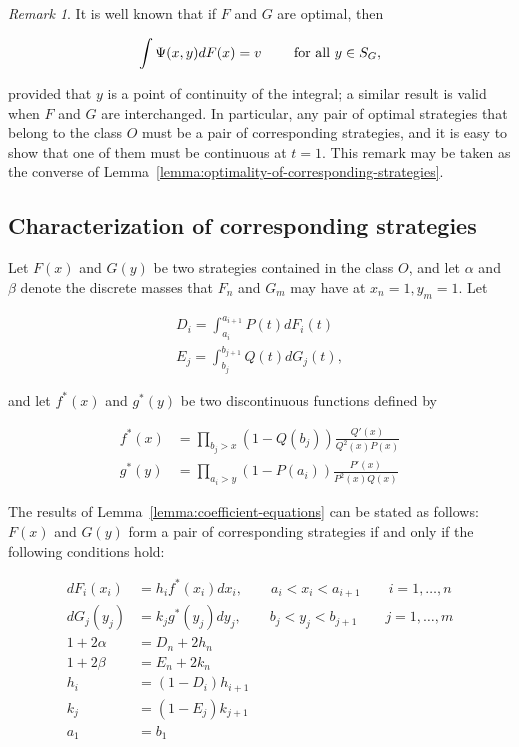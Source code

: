 \documentclass{article}
\theoremstyle{remark}
\newtheorem{remark}{Remark}
\begin{document}
\begin{remark}

It is well known that if $F$ and $G$ are optimal, then

\[
\int \Psi(x, y) dF(x) = v \qquad \textup{ for all } y \in S_G,
\]

provided that $y$ is a point of continuity of the integral; a similar result is
valid when $F$ and $G$ are interchanged. In particular, any pair of optimal
strategies that belong to the class $O$ must be a pair of corresponding
strategies, and it is easy to show that one of them must be continuous at
$t=1$. This remark may be taken as the converse of
Lemma~\ref{lemma:optimality-of-corresponding-strategies}.

\end{remark}

\subsection{Characterization of corresponding strategies}

Let $F(x)$ and $G(y)$ be two strategies contained in the class $O$, and let
$\alpha$ and $\beta$ denote the discrete masses that $F_n$ and $G_m$ may have
at $x_n = 1, y_m=1$. Let

\[
\begin{aligned}
D_i = \int_{a_i}^{a_{i+1}} P(t) dF_i(t) \\
E_j = \int_{b_j}^{b_{j+1}} Q(t) dG_j(t),
\end{aligned}
\]

and let $f^*(x)$ and $g^*(y)$ be two discontinuous functions defined by

\begin{align}
f^*(x) &= \prod_{b_j > x} (1-Q(b_j)) \frac{Q'(x)}{Q^2(x) P(x)}
\label{eqn:characterization-6} \\
g^*(y) &= \prod_{a_i > y} (1-P(a_i)) \frac{P'(x)}{P^2(x) Q(x)} \label{eqn:characterization-7}
\end{align}

The results of Lemma~\ref{lemma:coefficient-equations} can be stated as
follows: $F(x)$ and $G(y)$ form a pair of corresponding strategies if and only
if the following conditions hold:

\begin{align}
dF_i(x_i) &= h_i f^*(x_i) dx_i, \qquad a_i < x_i < a_{i+1} \qquad i=1, \dots, n \label{eqn:characterization-8} \\
dG_j(y_j) &= k_j g^*(y_j) dy_j, \qquad b_j < y_j < b_{j+1} \qquad j=1, \dots, m \label{eqn:characterization-9} \\
1 + 2 \alpha &= D_n + 2h_n \label{eqn:characterization-10} \\
1 + 2 \beta &= E_n + 2k_n \label{eqn:characterization-11} \\
h_i &= (1-D_i) h_{i+1} \label{eqn:characterization-12} \\
k_j &= (1-E_j) k_{j+1} \label{eqn:characterization-13} \\
a_1 &= b_1
\end{align}
\end{document}
